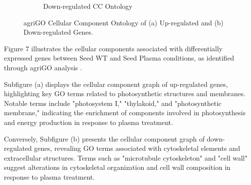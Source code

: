 \documentclass[12pt,letterpaper]{article}
\begin{document}
\begin{figure}[H]
\begin{subfigure}[b]{0.48\textwidth}
    \caption{Down-regulated CC Ontology}
    \label{fig:enter-label}
\end{subfigure}
\caption{agriGO Cellular Component Ontology of (a) Up-regulated and (b) Down-regulated Genes.}
\end{figure}

Figure 7 illustrates the cellular components associated with differentially expressed genes between Seed WT and Seed Plasma conditions, as identified through agriGO analysis \parencite{tian2017agrigo}.

Subfigure (a) displays the cellular component graph of up-regulated genes, highlighting key GO terms related to photosynthetic structures and membranes. Notable terms include "photosystem I," "thylakoid," and "photosynthetic membrane," indicating the enrichment of components involved in photosynthesis and energy production in response to plasma treatment.

Conversely, Subfigure (b) presents the cellular component graph of down-regulated genes, revealing GO terms associated with cytoskeletal elements and extracellular structures. Terms such as "microtubule cytoskeleton" and "cell wall" suggest alterations in cytoskeletal organization and cell wall composition in response to plasma treatment.
\end{document}
